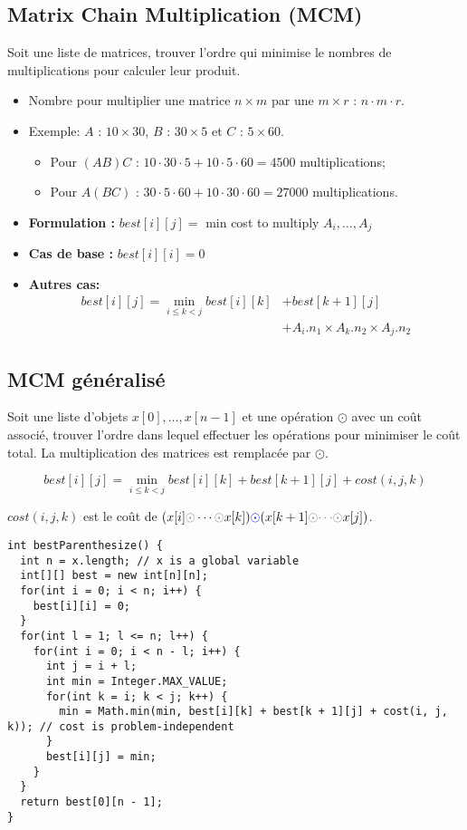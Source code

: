 \subsection{Matrix Chain Multiplication (MCM)}
Soit une liste de matrices, trouver l'ordre qui minimise le nombres de multiplications pour calculer leur produit.

\begin{itemize}
 \item Nombre pour multiplier une matrice $n \times m$ par une $m \times r$ : $n \cdot m \cdot r$.

 \item Exemple: $A$ : $10 \times 30$, $B$ : $30 \times 5$ et $C$ : $5 \times 60$.
 \begin{itemize}
 \item Pour $(AB)C$ : $10 \cdot 30 \cdot 5 + 10 \cdot 5 \cdot 60 = 4500$ multiplications;
 \item Pour $A(BC)$ : $30 \cdot 5 \cdot 60 + 10 \cdot 30 \cdot 60 = 27000$ multiplications.
  \end{itemize}
\end{itemize}

\begin{itemize}
 \item \textbf{Formulation :}
 $best[i][j] =$ min cost to multiply $A_i, \ldots, A_j$
 \item \textbf{Cas de base :} $best[i][i] = 0 $
 \item \textbf{Autres cas:}
 \begin{align*}
 best[i][j] = \min_{i \leq k < j} best[i][k] & + best[k + 1][j] \\
                                             & + A_i.n_1 \times A_k.n_2 \times A_j.n_2
 \end{align*}
\end{itemize}

\subsection{MCM généralisé}
Soit une liste d'objets $x[0], \ldots, x[n - 1]$ et une opération $\odot$ avec un coût associé, trouver l'ordre dans lequel effectuer les opérations pour minimiser le coût total. La multiplication des matrices est remplacée par $\odot$.

$$ best[i][j] = \min_{i \leq k < j} best[i][k] + best[k + 1][j] + cost(i, j, k)$$

$cost(i, j, k)$ est le coût de $(x[i] {\color{gray} \odot} \cdots {\color{gray} \odot} x[k]) {\color{blue} \mathbf{\odot}} (x[k + 1] {\color{gray} \odot} {\color{gray} \cdots} {\color{gray} \odot} x[j])$.
\newline
\begin{lstlisting}
int bestParenthesize() {
  int n = x.length; // x is a global variable
  int[][] best = new int[n][n];
  for(int i = 0; i < n; i++) { 
    best[i][i] = 0;
  }
  for(int l = 1; l <= n; l++) {
    for(int i = 0; i < n - l; i++) {
      int j = i + l;
      int min = Integer.MAX_VALUE;
      for(int k = i; k < j; k++) {
        min = Math.min(min, best[i][k] + best[k + 1][j] + cost(i, j, k)); // cost is problem-independent
      }
      best[i][j] = min;
    }
  }
  return best[0][n - 1];
} 
\end{lstlisting}